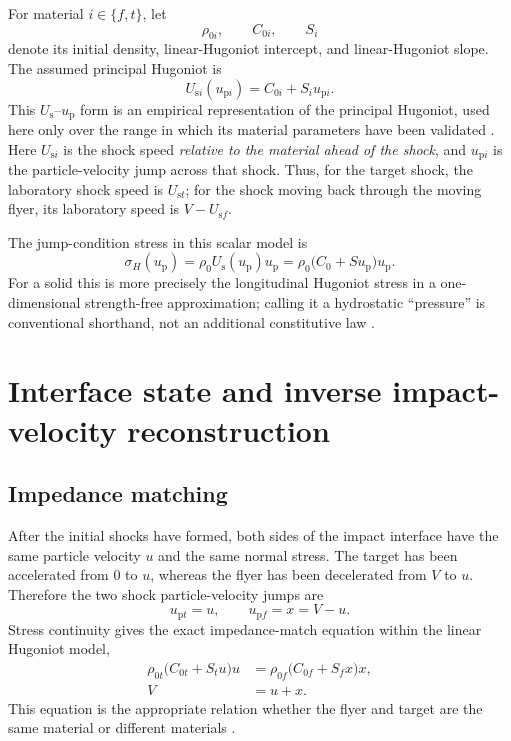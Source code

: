\documentclass[11pt]{article}
\newcommand{\rhoz}[1][]{\rho_{0#1}}
\newcommand{\Us}[1][]{U_{\mathrm{s}#1}}
\newcommand{\up}[1][]{u_{\mathrm{p}#1}}
\newcommand{\sig}{\sigma}
\begin{document}
For material $i\in\{f,t\}$, let
\begin{equation}
  \rhoz[i],\qquad C_{0i},\qquad S_i
\end{equation}
denote its initial density, linear-Hugoniot intercept, and linear-Hugoniot
slope.  The assumed principal Hugoniot is
\begin{equation}
  \Us[i](\up[i])=C_{0i}+S_i\up[i].
  \label{eq:linear-hugoniot}
\end{equation}
This $\Us$--$\up$ form is an empirical representation of the principal
Hugoniot, used here only over the range in which its material parameters have
been validated \cite{Kerley2006}.
Here $\Us[i]$ is the shock speed \emph{relative to the material ahead of the
shock}, and $\up[i]$ is the particle-velocity jump across that shock.  Thus,
for the target shock, the laboratory shock speed is $\Us[t]$; for the shock
moving back through the moving flyer, its laboratory speed is $V-\Us[f]$.

The jump-condition stress in this scalar model is
\begin{equation}
  \sig_H(\up)=\rhoz\Us(\up)\up
  =\rhoz\bigl(C_0+S\up\bigr)\up.
  \label{eq:hugoniot-stress}
\end{equation}
For a solid this is more precisely the longitudinal Hugoniot stress in a
one-dimensional strength-free approximation; calling it a hydrostatic
``pressure'' is conventional shorthand, not an additional constitutive law
\cite{Rice1958}.

\section{Interface state and inverse impact-velocity reconstruction}

\subsection{Impedance matching}

After the initial shocks have formed, both sides of the impact interface have
the same particle velocity $u$ and the same normal stress.  The target has
been accelerated from $0$ to $u$, whereas the flyer has been decelerated from
$V$ to $u$.  Therefore the two shock particle-velocity jumps are
\begin{equation}
  \up[t]=u,\qquad \up[f]=x=V-u.
  \label{eq:jumps}
\end{equation}
Stress continuity gives the exact impedance-match equation within the linear
Hugoniot model,
\begin{align}
  \rhoz[t]\bigl(C_{0t}+S_tu\bigr)u
  &=\rhoz[f]\bigl(C_{0f}+S_fx\bigr)x,
  \label{eq:impedance-match}\\
  V&=u+x.
\end{align}
This equation is the appropriate relation whether the flyer and target are
the same material or different materials \cite{Rice1958,Kerley2008}.
\end{document}
